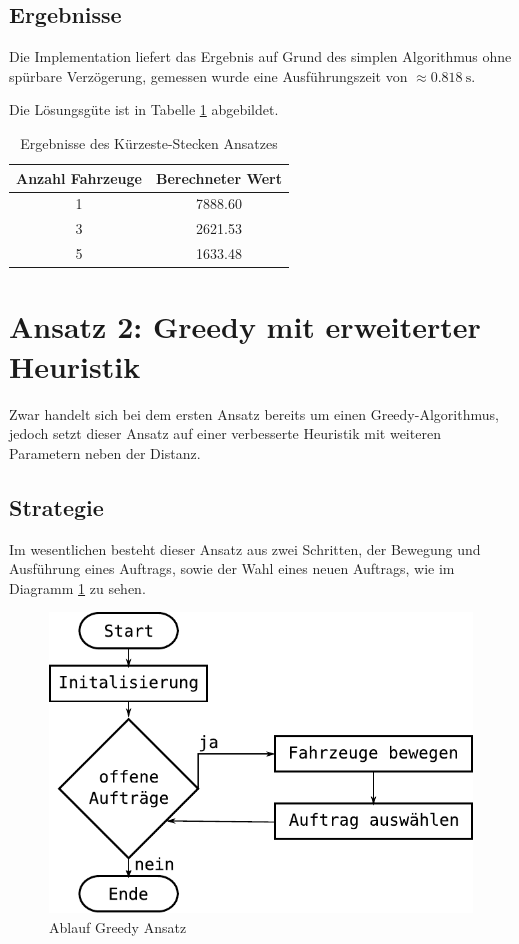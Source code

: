 \documentclass[ngerman]{tudscrreprt}
\begin{document}
\subsection{Ergebnisse}
Die Implementation liefert das Ergebnis auf Grund des simplen Algorithmus ohne spürbare
Verzögerung, gemessen wurde eine Ausführungszeit von $\approx \SI{0.818}{\second}$.

Die Lösungsgüte ist in Tabelle \ref{table:shortest-paths} abgebildet.

\begin{table}[H]
    \centering
    \begin{tabular}{|c|c|}
    \hline
    Anzahl Fahrzeuge & Berechneter Wert \\ \hline
    1                & \num{7888.60}    \\ \hline
    3                & \num{2621.53}    \\ \hline
    5                & \num{1633.48}    \\ \hline
    \end{tabular}
    \caption{Ergebnisse des Kürzeste-Stecken Ansatzes}
    \label{table:shortest-paths}
\end{table}


\section{Ansatz 2: Greedy mit erweiterter Heuristik}
Zwar handelt sich bei dem ersten Ansatz bereits um einen Greedy-Algorithmus,
jedoch setzt dieser Ansatz auf einer verbesserte Heuristik mit weiteren
Parametern neben der Distanz.

\subsection{Strategie}
Im wesentlichen besteht dieser Ansatz aus zwei Schritten, der Bewegung und Ausführung eines Auftrags, sowie der Wahl eines neuen Auftrags, wie im Diagramm \ref{figure:greedy-diagram} zu sehen.

\begin{figure}[H]
    \centering
    \includegraphics[scale=0.5]{images/greedy-diagram}
    \caption{Ablauf Greedy Ansatz}
    \label{figure:greedy-diagram}
\end{figure}
\end{document}
